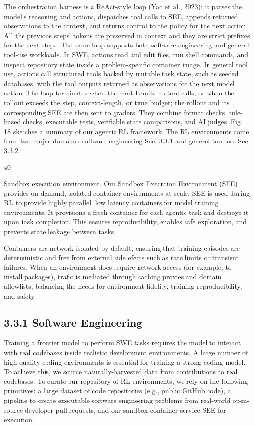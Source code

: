 \documentclass[
  10
]{article}
\begin{document}
The orchestration harness is a ReAct-style loop (Yao et al., 2023): it
parses the model's reasoning and actions, dispatches tool calls to SEE,
appends returned observations to the context, and returns control to the
policy for the next action. All the previous steps' tokens are preserved
in context and they are strict prefixes for the next steps. The same
loop supports both software-engineering and general tool-use workloads.
In SWE, actions read and edit files, run shell commands, and inspect
repository state inside a problem-specific container image. In general
tool use, actions call structured tools backed by mutable task state,
such as seeded databases, with the tool outputs returned as observations
for the next model action. The loop terminates when the model emits no
tool calls, or when the rollout exceeds the step, context-length, or
time budget; the rollout and its corresponding SEE are then sent to
graders. They combine format checks, rule-based checks, executable
tests, verifiable state comparisons, and AI judges. Fig. 18 sketches a
summary of our agentic RL framework. The RL environments come from two
major domains: software engineering Sec. 3.3.1 and general tool-use Sec.
3.3.2.

40

Sandbox execution environment. Our Sandbox Execution Environment (SEE)
provides on-demand, isolated container environments at scale. SEE is
used during RL to provide highly parallel, low latency containers for
model training environments. It provisions a fresh container for each
agentic task and destroys it upon task completion. This ensures
reproducibility, enables safe exploration, and prevents state leakage
between tasks.

Containers are network-isolated by default, ensuring that training
episodes are deterministic and free from external side efects such as
rate limits or transient failures. When an environment does require
network access (for example, to install packages), trafic is mediated
through caching proxies and domain allowlists, balancing the needs for
environment fidelity, training reproducibility, and safety.

\subsection{3.3.1 Software Engineering}\label{software-engineering}

Training a frontier model to perform SWE tasks requires the model to
interact with real codebases inside realistic development environments.
A large number of high-quality coding environments is essential for
training a strong coding model. To achieve this, we source
naturally-harvested data from contributions to real codebases. To curate
our repository of RL environments, we rely on the following primitives:
a large dataset of code repositories (e.g., public GitHub code), a
pipeline to create executable software engineering problems from
real-world open-source developer pull requests, and our sandbox
container service SEE for execution.
\end{document}
